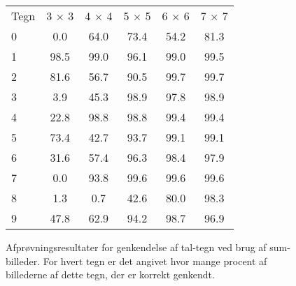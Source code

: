 \begin{figure}[htp]
\centering
\begin{tabular}{|l|c|c|c|c|c|}\hline
\rowcolor[gray]{0.9} \multicolumn{6}{|>{\columncolor[gray]{0.9}}c|}{\textbf{Sum-billeder}} \\ \hline
Tegn & 3 $\times$ 3 & 4 $\times$ 4 & 5 $\times$ 5 & 6 $\times$ 6 & 7 $\times$ 7\\\hline
0 & 0.0 & 64.0 & 73.4 & 54.2 & 81.3\\\hline
1 & 98.5  & 99.0 & 96.1 & 99.0 & 99.5\\\hline
2 & 81.6 & 56.7 & 90.5 & 99.7 & 99.7\\\hline
3 & 3.9 & 45.3 & 98.9 & 97.8 & 98.9\\\hline
4 & 22.8 & 98.8 & 98.8 & 99.4 & 99.4\\\hline
5 & 73.4 & 42.7 & 93.7 & 99.1 & 99.1\\\hline
6 & 31.6 & 57.4 & 96.3 & 98.4 & 97.9\\\hline
7 & 0.0 & 93.8 & 99.6 & 99.6 & 99.6\\\hline
8 & 1.3 & 0.7 & 42.6 & 80.0 & 98.3\\\hline
9 & 47.8 & 62.9 & 94.2 & 98.7 & 96.9\\\hline
\end{tabular}
\caption{Afprøvningsresultater for genkendelse af tal-tegn ved brug af sum-billeder. For hvert tegn er det angivet hvor mange procent af billederne af dette tegn, der er korrekt genkendt.}
\label{fig:test:sum_tal}
\end{figure}

